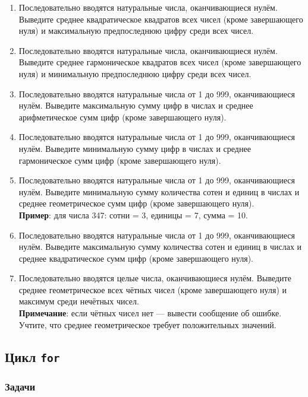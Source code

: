 \documentclass[12pt]{article}
\begin{document}
\begin{enumerate}
    \item Последовательно вводятся натуральные числа, оканчивающиеся нулём. Выведите среднее квадратическое квадратов всех чисел (кроме завершающего нуля) и максимальную предпоследнюю цифру среди всех чисел.

    \item Последовательно вводятся натуральные числа, оканчивающиеся нулём. Выведите среднее гармоническое квадратов всех чисел (кроме завершающего нуля) и минимальную предпоследнюю цифру среди всех чисел.

    \item Последовательно вводятся натуральные числа от 1 до 999, оканчивающиеся нулём. Выведите максимальную сумму цифр в числах и среднее арифметическое сумм цифр (кроме завершающего нуля).

    \item Последовательно вводятся натуральные числа от 1 до 999, оканчивающиеся нулём. Выведите минимальную сумму цифр в числах и среднее гармоническое сумм цифр (кроме завершающего нуля).

    \item Последовательно вводятся натуральные числа от 1 до 999, оканчивающиеся нулём. Выведите минимальную сумму количества сотен и единиц в числах и среднее геометрическое сумм цифр (кроме завершающего нуля). \\
    \textbf{Пример}: для числа 347: сотни = 3, единицы = 7, сумма = 10.

    \item Последовательно вводятся натуральные числа от 1 до 999, оканчивающиеся нулём. Выведите максимальную сумму количества сотен и единиц в числах и среднее квадратическое сумм цифр (кроме завершающего нуля).

    \item Последовательно вводятся целые числа, оканчивающиеся нулём. Выведите среднее геометрическое всех чётных чисел (кроме завершающего нуля) и максимум среди нечётных чисел. \\
    \textbf{Примечание}: если чётных чисел нет — вывести сообщение об ошибке. Учтите, что среднее геометрическое требует положительных значений.
\end{enumerate}

\subsection{Цикл \texttt{for}}

\subsubsection*{Задачи}
\end{document}
